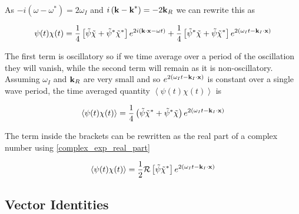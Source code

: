As $-i \left(\omega - \omega^* \right) = 2 \omega_I$ and $i \left( \textbf{k} - \textbf{k}^* \right) = -2 \textbf{k}_R$ we can rewrite this as

\begin{equation}
	\psi(t) \chi(t) = \frac{1}{4} \left[ \tilde{\psi}\tilde{\chi} + \tilde{\psi}^* \tilde{\chi}^* \right] e^{2i \left(\textbf{k} \cdot \textbf{x} - \omega t \right)} + \frac{1}{4} \left[ \tilde{\psi}^* \tilde{\chi} + \tilde{\psi} \tilde{\chi}^* \right] e^{2 \left( \omega_I t - \textbf{k}_I \cdot \textbf{x} \right)}
\end{equation}

The first term is oscillatory so if we time average over a period of the oscillation they will vanish, while the second term will remain as it is non-oscillatory. Assuming $\omega_I$ and $\textbf{k}_R$ are very small and so $e^{2 \left( \omega_I t - \textbf{k}_I \cdot \textbf{x} \right)}$ is constant over a single wave period, the time averaged quantity $\left\langle \psi(t) \chi(t) \right\rangle$ is

\begin{equation} \label{Complex Exponential Product Time Averaged}
	\left\langle \psi(t) \chi(t) \right\rangle = \frac{1}{4} \left( \tilde{\psi} \tilde{\chi}^* + \tilde{\psi}^* \tilde{\chi} \right) e^{2 \left( \omega_I t - \textbf{k}_I \cdot \textbf{x} \right)}
\end{equation}

The term inside the brackets can be rewritten as the real part of a complex number using \eqref{complex_exp_real_part}

\begin{equation}
	\left\langle \psi(t) \chi(t) \right\rangle = \frac{1}{2} \mathcal{R} \left[ \tilde{\psi} \tilde{\chi}^* \right] e^{2 \left( \omega_I t - \textbf{k}_I \cdot \textbf{x} \right)}
\end{equation}

\subsection{Vector Identities}
